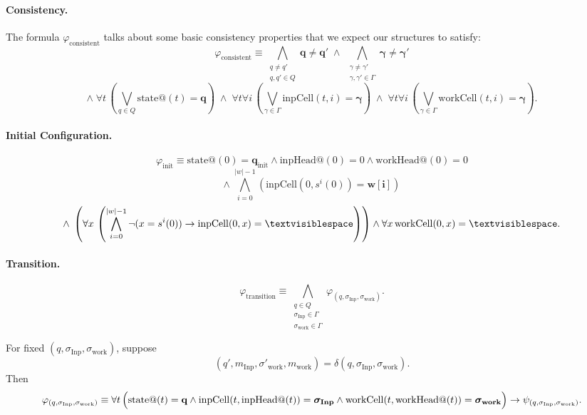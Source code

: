 \documentclass{article}
\begin{document}
\paragraph{Consistency.}
The formula $\varphi_{\mathrm{consistent}}$ talks about some basic consistency properties that we expect our structures to satisfy:
\[
\varphi_{\mathrm{consistent}} \equiv
\bigwedge_{\substack{q\neq q'\\ q,q'\in Q}} \mathbf{q}\neq \mathbf{q'}
\;\land\;
\bigwedge_{\substack{\gamma\neq \gamma'\\ \gamma,\gamma'\in \Gamma}} \boldsymbol{\gamma}\neq \boldsymbol{\gamma'}
\]
\[
\land\;
\forall t\, \left(\bigvee_{q\in Q}\mathrm{state@}(t)=\mathbf{q}\right)
\;\land\;
\forall t \forall i\, \left(\bigvee_{\gamma\in \Gamma}\mathrm{inpCell}(t,i)=\boldsymbol{\gamma}\right)
\;\land\;
\forall t \forall i\, \left(\bigvee_{\gamma\in \Gamma}\mathrm{workCell}(t,i)=\boldsymbol{\gamma}\right).
\]

\paragraph{Initial Configuration.}
\[
\varphi_{\mathrm{init}} \equiv
\mathrm{state@}(0)=\mathbf{q_{\mathrm{init}}}
\land
\mathrm{inpHead@}(0)=0
\land
\mathrm{workHead@}(0)=0
\]
\[
\land\;
\bigwedge_{i=0}^{|w|-1}\left(\mathrm{inpCell}(0,s^i(0))=\mathbf{w[i]}\right)
\]
\[
\land\;
\left(
\forall x\,
\left(
\bigwedge_{i=0}^{|w|-1}\neg(x=s^i(0))
\to
\mathrm{inpCell}(0,x)=\boldsymbol{\textvisiblespace}
\right)
\right)
\land
\forall x\, \mathrm{workCell}(0,x)=\boldsymbol{\textvisiblespace}.
\]

\paragraph{Transition.}
\[
\varphi_{\mathrm{transition}} \equiv
\bigwedge_{\substack{q\in Q\\ \sigma_{\mathrm{Inp}}\in \Gamma\\ \sigma_{\mathrm{work}}\in \Gamma}}
\varphi_{(q,\sigma_{\mathrm{Inp}},\sigma_{\mathrm{work}})}.
\]

For fixed $(q,\sigma_{\mathrm{Inp}},\sigma_{\mathrm{work}})$, suppose
\[
(q',m_{\mathrm{Inp}},\sigma'_{\mathrm{work}},m_{\mathrm{work}})
=
\delta(q,\sigma_{\mathrm{Inp}},\sigma_{\mathrm{work}}).
\]
Then
\[
\varphi_{(q,\sigma_{\mathrm{Inp}},\sigma_{\mathrm{work}})}
\equiv
\forall t\,
\Bigl(
\mathrm{state@}(t)=\mathbf{q}
\land
\mathrm{inpCell}(t,\mathrm{inpHead@}(t))=\boldsymbol{\sigma_{\mathrm{Inp}}}
\land
\mathrm{workCell}(t,\mathrm{workHead@}(t))=\boldsymbol{\sigma_{\mathrm{work}}}
\Bigr)
\to
\psi_{(q,\sigma_{\mathrm{Inp}},\sigma_{\mathrm{work}})}.
\]
\end{document}
